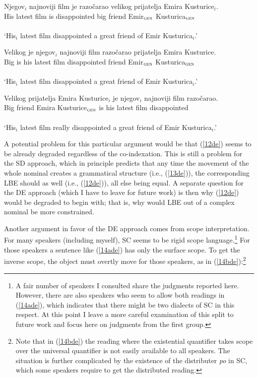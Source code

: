 \documentclass[
    output=paper,
    colorlinks,
    citecolor=brown,
]{langscibook}
\begin{document}
\begin{exe}
\ex \label{11de}
\gll *Njegov$_{i}$  najnoviji film je  razočarao      velikog prijatelja Emira Kusturice$_{i}$.\\
His latest film is disappointed big friend Emir$_{\textsc{gen}}$ Kusturica$_{\textsc{gen}}$\\\\
‘His$_{i}$ latest film disappointed a great friend of Emir Kusturica$_{i}$.’

\ex \label{12de}
\gll *Velikog je njegov$_{i}$ najnoviji film  razočarao prijatelja Emira Kusturice.\\
Big is his latest film disappointed friend Emir$_{\textsc{gen}}$ Kusturica$_{\textsc{gen}}$\\\\
‘His$_{i}$ latest film disappointed a great friend of Emir Kusturica$_{i}$.’


\ex \label{13de}
\gll Velikog prijatelja Emira Kusturice$_{i}$ je njegov$_{i}$  najnoviji film razočarao.\\
Big friend Emira Kusturice$_{\textsc{gen}}$ is his latest film disappointed\\\\
‘His$_{i}$ latest film really disappointed a great friend of Emir Kusturica$_{i}$.’

\end{exe}

A potential problem for this particular argument would be that (\ref{12de}) seems to be already degraded regardless of the co-indexation. This is still a problem for the SD approach, which in principle predicts that any time the movement of the whole nominal creates a grammatical structure (i.e., (\ref{13de})), the corresponding LBE should as well (i.e., (\ref{12de})), all else being equal. A separate question for the DE approach (which I have to leave for future work) is then why (\ref{12de}) would be degraded to begin with; that is, why would LBE out of a complex nominal be more constrained.

Another argument in favor of the DE approach comes from scope interpretation. For many speakers (including myself), SC seems to be rigid scope language.\footnote{A fair number of speakers I consulted share the judgments reported here. However, there are also speakers who seem to allow both readings in (\ref{14ade}), which indicates that there might be two dialects of SC in this respect. At this point I leave a more careful examination of this split to future work and focus here on judgments from the first group.} For those speakers a sentence like (\ref{14ade}) has only the surface scope. To get the inverse scope, the object must overtly move for those speakers, as in (\ref{14bde}):\footnote{Note that in (\ref{14bde}) the reading where the existential quantifier takes scope over the universal quantifier is not easily available to all speakers. The situation is further complicated by the existence of the distributer \textit{po} in SC, which some speakers require to get the distributed reading.} 
\end{document}
